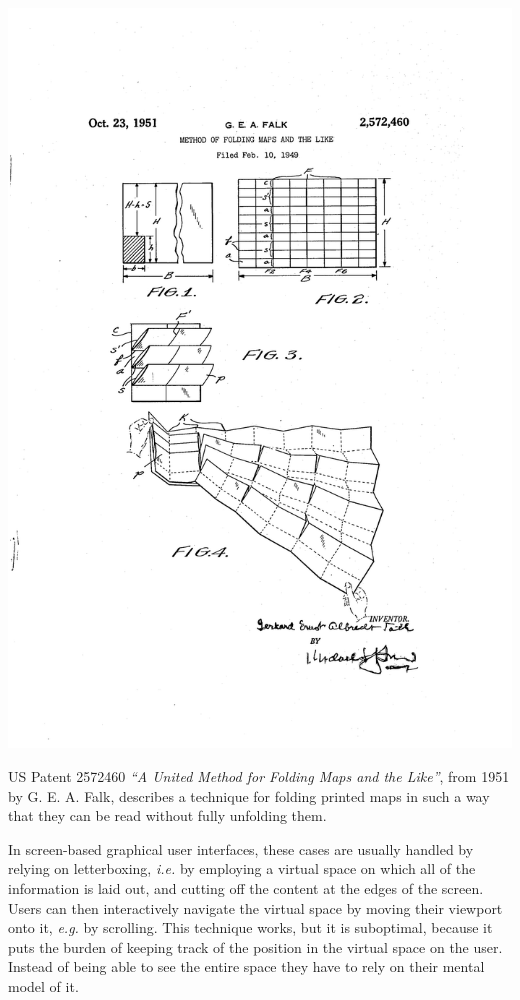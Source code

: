 \documentclass{tufte-book} %
\newcommand{\hairsp}{\hspace{1pt}} %
\newcommand{\ie}{\textit{i.\hairsp{}e.}\xspace} %
\newcommand{\eg}{\textit{e.\hairsp{}g.}\xspace} %
\begin{document}
\begin{marginfigure}
\includegraphics[width=\linewidth]{falk-patent.png}
\caption{US Patent 2572460 \emph{``A United Method for Folding Maps and the Like''}, from 1951 by G. E. A. Falk, describes a technique for folding printed maps in such a way that they can be read without fully unfolding them.}
\label{fig:falkmap}
\end{marginfigure}

In screen-based graphical user interfaces, these cases are usually handled by relying on letterboxing, \ie by employing a virtual space on which all of the information is laid out, and cutting off the content at the edges of the screen. Users can then interactively navigate the virtual space by moving their viewport onto it, \eg by scrolling. This technique works, but it is suboptimal, because it puts the burden of keeping track of the position in the virtual space on the user. Instead of being able to see the entire space they have to rely on their mental model of it.
\end{document}
